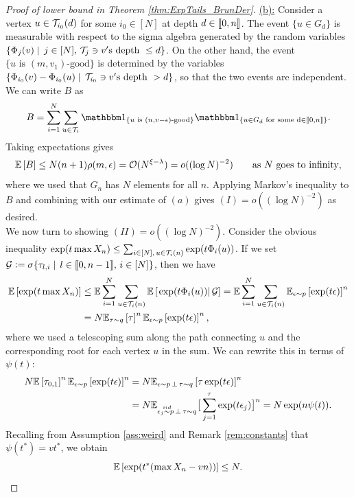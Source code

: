 \begin{proof}[Proof of lower bound in Theorem \ref{thm:ExpTails_BrunDer}]
\underline{(b):} Consider a vertex $u \in \cal{T}_{i_0}(d)$ for some $i_0 \in [N]$ at depth $d \in \bbracket{0, n}$. The event $\{u \in G_d\}$ is measurable with respect to the sigma algebra generated by the random variables $\{ \Phi_j(v) \mid\, j \in [N],\,\cal{T}_j \ni v'\text{s depth }\leq d\}$. On the other hand, the event $\{ u \text{ is }(m, v_1) \text{-good}\}$ is determined by the variables $\{ \Phi_{i_0}(v) - \Phi_{i_0}(u) \mid\, \cal{T}_{i_0} \ni v'\text{s depth }> d\}$, so that the two events are independent. We can write $B$ as 
\begin{equation*}
B = \sum\limits_{i=1}^N \sum\limits_{u \in \cal{T}_i} \Ind_{\{u \text{ is } (n, v - \epsilon)\text{-good}\}} \Ind_{\{u \in G_d \text{ for some d} \in \bbracket{0,n}\}}. 
\end{equation*}
Taking expectations gives 
\begin{equation}
\Ex{B} \leq N(n+1)\rho(m, \epsilon) = \cal{O}(N^{\xi -\lambda}) = o((\log N)^{-2}) \qquad\text{as $N$ goes to infinity}, 
\end{equation}
where we used that $G_n$ has $N$ elements for all $n$. Applying Markov's inequality to $B$ and combining with our estimate of $(a)$ gives $(I) = o((\log N)^{-2})$ as desired. \\

We now turn to showing $(II) = o((\log N)^{-2})$. Consider the obvious inequality $\exp(t \max X_n) \leq \sum_{i \in [N],\, u \in \cal{T}_i(n)} \exp(t \Phi_i(u))$. If we set $\cal{G} \defeq \sigma\{ \tau_{l, i} \mid\, l\in\bbracket{0,n-1},\, i \in [N]\}$, then we have
\begin{align}
\Ex{\exp(t \max X_n)} &\leq \E \sum\limits_{i=1}^N \sum\limits_{u \in \cal{T}_i(n)} \ExCond{\exp(t \Phi_i(u))}{\cal{G}} = \E \sum\limits_{i=1}^N \sum\limits_{u \in \cal{T}_i(n)} \E_{\epsilon \sim p} \left[\exp(t \epsilon)\right]^n \\
 					  &= N \E_{\tau \sim q}\left[\tau\right]^n \E_{\epsilon \sim p}\left[\exp(t \epsilon)\right]^n, 
\end{align}
where we used a telescoping sum along the path connecting $u$ and the corresponding root for each vertex $u$ in the sum. We can rewrite this in terms of $\psi(t)$:
\begin{align}
N \Ex{\tau_{0,1}}^n \E_{\epsilon \sim p}\left[\exp(t \epsilon)\right]^n &= N \E_{\epsilon \sim p\,\perp\, \tau \sim q}\left[\tau \exp(t \epsilon)\right]^n \\
			&= N \E_{ \epsilon_j \stackrel{\mathclap{iid}}{\sim} p\,\perp\, \tau \sim q} \big[ \sum\limits^{\tau}_{j = 1} \exp(t \epsilon_j) \big]^n = N \exp(n \psi(t)). 
\end{align}
Recalling from Assumption \ref{ass:weird} and Remark \ref{rem:constants} that $\psi(t^*) = v t^*$, we obtain
\begin{equation} \label{eqn:ExpTailT*bound}
\Ex{\exp(t^* (\max X_n - vn))} \leq N.   
\end{equation}


\end{proof}
